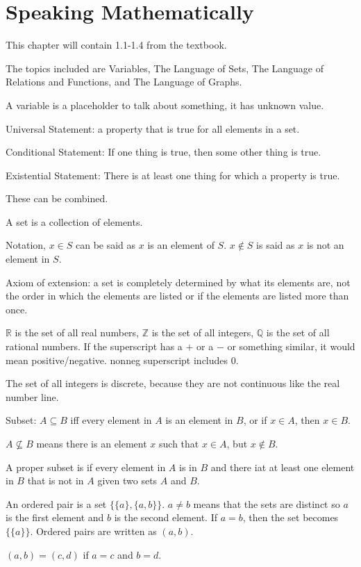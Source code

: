 \documentclass[../discrete.tex]{subfiles}
\begin{document}
\chapter{Speaking Mathematically}
This chapter will contain 1.1-1.4 from the textbook.

The topics included are Variables, The Language of Sets, The Language of Relations and Functions, and The Language of Graphs.

A variable is a placeholder to talk about something, it has unknown value.

Universal Statement: a property that is true for all elements in a set.

Conditional Statement: If one thing is true, then some other thing is true.

Existential Statement: There is at least one thing for which a property is true.

These can be combined.

A set is a collection of elements.

Notation, $x\in S$ can be said as $x$ is an element of $S$. $x\notin S$ is said as $x$ is not an element in $S$.

Axiom of extension: a set is completely determined by what its elements are, not the order in which the elements are listed or if the elements are listed more than once.

$\mathbb{R}$ is the set of all real numbers, $\mathbb{Z}$ is the set of all integers, $\mathbb{Q}$ is the set of all rational numbers. If the superscript has a $+$ or a $-$ or something similar, it would mean positive/negative. nonneg superscript includes $0$.

The set of all integers is discrete, because they are not continuous like the real number line.

Subset: $A\subseteq B$ iff every element in $A$ is an element in $B$, or if $x\in A$, then $x\in B$.

$A\nsubseteq B$ means there is an element $x$ such that $x\in A$, but $x\notin B$.

A proper subset is if every element in $A$ is in $B$ and there iat at least one element in $B$ that is not in $A$ given two sets $A$ and $B$.

An ordered pair is a set $\{ \{a\}, \{a,b\}\}$. $a\neq b$ means that the sets are distinct so $a$ is the first element and $b$ is the second element. If $a=b$, then the set becomes $\{\{a\}\}$. Ordered pairs are written as $(a,b)$.

$(a,b)=(c,d)$ if $a=c$ and $b=d$.
\end{document}
